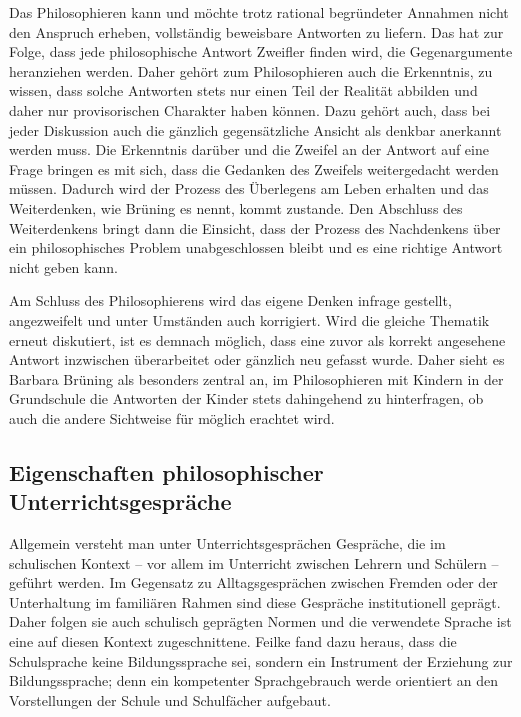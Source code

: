 Das Philosophieren kann und möchte trotz rational begründeter Annahmen nicht den Anspruch erheben, vollständig beweisbare Antworten zu liefern. 
Das hat zur Folge, dass jede philosophische Antwort Zweifler finden wird, die Gegenargumente heranziehen werden. 
Daher gehört zum Philosophieren auch die Erkenntnis, zu wissen, dass solche Antworten stets nur einen Teil der Realität abbilden und daher nur provisorischen Charakter haben können. 
Dazu gehört auch, dass bei jeder Diskussion auch die gänzlich gegensätzliche Ansicht als denkbar anerkannt werden muss. 
Die Erkenntnis darüber und die Zweifel an der Antwort auf eine Frage bringen es mit sich, dass die Gedanken des Zweifels weitergedacht werden müssen. 
Dadurch wird der Prozess des Überlegens am Leben erhalten und das Weiterdenken, wie Brüning es nennt, kommt zustande. 
Den Abschluss des Weiterdenkens bringt dann die Einsicht, \glqq dass der Prozess des Nachdenkens über ein philosophisches Problem unabgeschlossen bleibt\grqq{}\cite[S.\,13]{BB10} und es eine \glqq richtige\grqq{} Antwort nicht geben kann.

Am Schluss des Philosophierens wird das eigene Denken infrage gestellt, angezweifelt und unter Umständen auch korrigiert. 
Wird die gleiche Thematik erneut diskutiert, ist es demnach möglich, dass eine zuvor als korrekt angesehene Antwort inzwischen überarbeitet oder gänzlich neu gefasst wurde. 
Daher sieht es Barbara Brüning als besonders zentral an, im Philosophieren mit Kindern in der Grundschule die Antworten der Kinder stets dahingehend zu hinterfragen, ob auch die andere Sichtweise für möglich erachtet wird.


\newpage
\subsection{Eigenschaften philosophischer Unterrichtsgespräche}

Allgemein versteht man unter Unterrichtsgesprächen Gespräche, die im schulischen Kontext -- vor allem im Unterricht zwischen Lehrern und Schülern -- geführt werden. 
Im Gegensatz zu Alltagsgesprächen zwischen Fremden oder der Unterhaltung im familiären Rahmen sind diese Gespräche \glqq institutionell geprägt\grqq{}\cite[S.\,28]{HB15}. 
Daher folgen sie auch schulisch geprägten Normen und die verwendete Sprache ist eine auf diesen Kontext zugeschnittene. 
Feilke fand dazu heraus, dass \glqq die Schulsprache keine Bildungssprache sei, sondern ein Instrument der Erziehung zur Bildungssprache; denn ein kompetenter Sprachgebrauch werde orientiert an den Vorstellungen der Schule und Schulfächer aufgebaut.\grqq{}\cite[S.\,117]{HF13}

